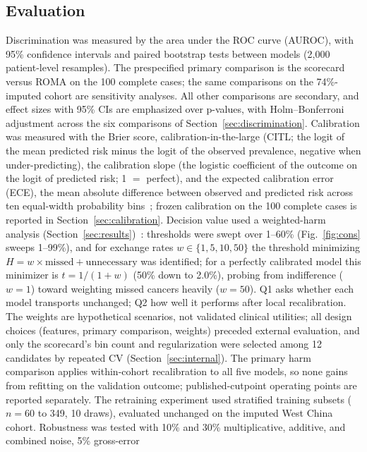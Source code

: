 \documentclass[conference]{IEEEtran}
\begin{document}
\subsection{Evaluation}\label{sec:evaluation}

Discrimination was measured by the area under the ROC curve (AUROC), with
95\% confidence intervals and paired bootstrap tests between
models (2{,}000 patient-level resamples). The prespecified primary
comparison is the scorecard versus ROMA on the 100 complete cases; the
same comparisons on the 74\%-imputed cohort are sensitivity analyses.
All other comparisons are secondary, and effect sizes with
95\% CIs are emphasized over p-values, with Holm--Bonferroni adjustment
across the six comparisons of Section~\ref{sec:discrimination}.
Calibration was measured with the Brier
score, calibration-in-the-large (CITL; the logit of the mean
predicted risk minus the logit of the observed prevalence, negative
when under-predicting), the calibration slope (the logistic
coefficient of the outcome on the logit of predicted risk;
1 $=$ perfect), and the expected calibration error (ECE), the mean
absolute difference between observed and predicted risk across ten
equal-width probability bins~\cite{vancalster2019}; frozen calibration
on the 100 complete cases is reported in
Section~\ref{sec:calibration}. Decision value used a weighted-harm
analysis
(Section~\ref{sec:results})~\cite{vickers2006}: thresholds were swept over 1--60\%
(Fig.~\ref{fig:cons} sweeps 1--99\%),
and for exchange rates $w\in\{1,5,10,50\}$ the threshold minimizing
$H=w\times\text{missed}+\text{unnecessary}$ was identified;
for a perfectly calibrated model this minimizer is $t=1/(1+w)$
(50\% down to 2.0\%), probing from indifference ($w=1$) toward
weighting missed cancers heavily ($w=50$).
Q1 asks whether each model transports unchanged; Q2 how well it
performs after local recalibration. The weights
are hypothetical scenarios, not validated clinical utilities; all
design choices (features, primary comparison, weights) preceded
external evaluation, and only the scorecard's bin count and
regularization
were selected among
12 candidates by repeated CV
(Section~\ref{sec:internal}). The primary harm comparison applies
within-cohort recalibration to all five models, so none gains from
refitting on the validation outcome; published-cutpoint
operating points are reported separately.
The retraining experiment used stratified training subsets ($n=60$
to 349, 10 draws), evaluated unchanged on the imputed West China
cohort. Robustness was tested with 10\% and 30\%
multiplicative, additive, and combined noise, 5\% gross-error
\end{document}
